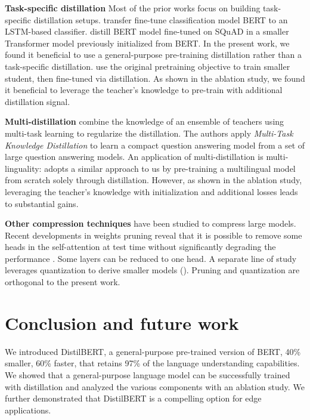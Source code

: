 \documentclass{article}
\begin{document}
\textbf{Task-specific distillation} Most of the prior works focus on building task-specific distillation setups. \citet{Tang2019DistillingTK} transfer fine-tune classification model BERT to an LSTM-based classifier. \citet{Chatterjee2019MakingNM} distill BERT model fine-tuned on SQuAD in a smaller Transformer model previously initialized from BERT. In the present work, we found it beneficial to use a general-purpose pre-training distillation rather than a task-specific distillation. \citet{Turc2019WellReadSL} use the original pretraining objective to train smaller student, then fine-tuned via distillation. As shown in the ablation study, we found it beneficial to leverage the teacher's knowledge to pre-train with additional distillation signal.

\textbf{Multi-distillation} \citet{Yang2019ModelCW} combine the knowledge of an ensemble of teachers using multi-task learning to regularize the distillation. The authors apply \textit{Multi-Task Knowledge Distillation} to learn a compact question answering model from a set of large question answering models. An application of multi-distillation is multi-linguality: \citet{Tsai2019SmallAP} adopts a similar approach to us by pre-training a multilingual model from scratch solely through distillation. However, as shown in the ablation study, leveraging the teacher's knowledge with initialization and additional losses leads to substantial gains.

\textbf{Other compression techniques} have been studied to compress large models. Recent developments in weights pruning reveal that it is possible to remove some heads in the self-attention at test time without significantly degrading the performance \citet{Michel2019AreSH}. Some layers can be reduced to one head. A separate line of study leverages quantization to derive smaller models (\citet{Gupta2015DeepLW}). Pruning and quantization are orthogonal to the present work.

\section{Conclusion and future work}

We introduced DistilBERT, a general-purpose pre-trained version of BERT, 40\% smaller, 60\% faster, that retains 97\% of the language understanding capabilities. We showed that a general-purpose language model can be successfully trained with distillation and analyzed the various components with an ablation study. We further demonstrated that DistilBERT is a compelling option for edge applications.


\fontsize{9.0pt}{9.0pt} \selectfont
 

\end{document}
